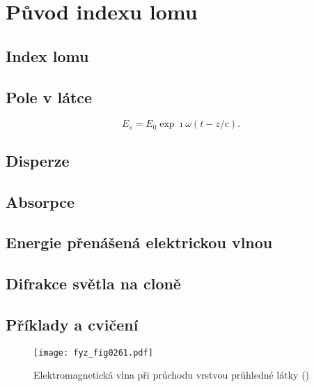 \setchaptertoc
\chapter{Původ indexu lomu}\label{fyz:IchapXXXI}

  \section{Index lomu}\label{fyz:IchapXXXIsecI}
  \section{Pole v látce}\label{fyz:IchapXXXIsecII}
    \begin{equation}\label{fyz:eq966}
      E_s=E_0\exp{\imath\omega(t-z/c)}.
      \end{equation}
  \section{Disperze}\label{fyz:IchapXXXIsecIII}
  \section{Absorpce}\label{fyz:IchapXXXIsecIV}
  \section{Energie přenášená elektrickou vlnou}\label{fyz:IchapXXXIsecV}
  \section{Difrakce světla na cloně}\label{fyz:IchapXXXIsecVI}
  \section{Příklady a cvičení}\label{fyz:IchapXXXIsecVII}

    \begin{figure}[ht!] %
      \centering
      \texttt{[image: fyz\_fig0261.pdf]}
      \caption{Elektromagnetická vlna při průchodu vrstvou průhledné látky
               (\cite[s.~411]{Feynman01})}
      \label{fyz:fig0261}
    \end{figure}

